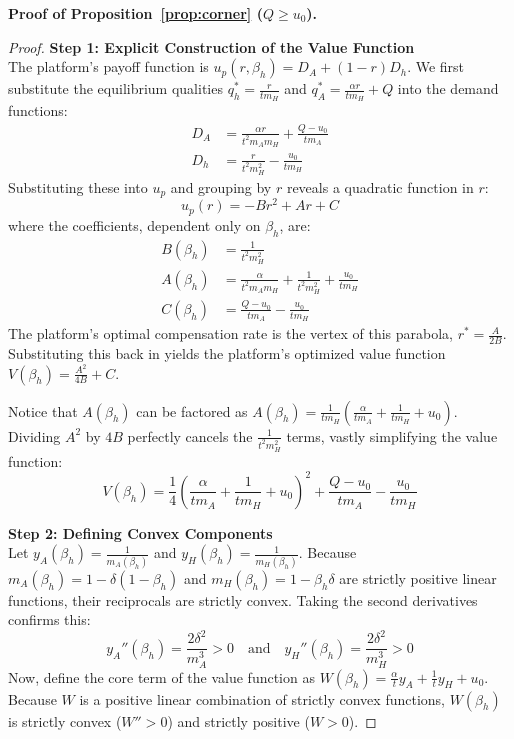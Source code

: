 \documentclass[mnsc,nonblindrev]{informs3_NoOR}
\begin{document}
\noindent\textbf{Proof of Proposition~\ref{prop:corner} ($Q \ge u_0$).}
\begin{proof}
\textbf{Step 1: Explicit Construction of the Value Function} \\
The platform's payoff function is $u_p(r, \beta_h) = D_A + (1-r)D_h$. We first substitute the equilibrium qualities $q_h^* = \frac{r}{tm_H}$ and $q_A^* = \frac{\alpha r}{tm_H} + Q$ into the demand functions:
\begin{align*}
D_A &= \frac{\alpha r}{t^2 m_A m_H} + \frac{Q-u_0}{t m_A} \\
D_h &= \frac{r}{t^2 m_H^2} - \frac{u_0}{t m_H}
\end{align*}
Substituting these into $u_p$ and grouping by $r$ reveals a quadratic function in $r$:
\begin{equation}
u_p(r) = -B r^2 + A r + C
\end{equation}
where the coefficients, dependent only on $\beta_h$, are:
\begin{align*}
B(\beta_h) &= \frac{1}{t^2 m_H^2} \\
A(\beta_h) &= \frac{\alpha}{t^2 m_A m_H} + \frac{1}{t^2 m_H^2} + \frac{u_0}{t m_H} \\
C(\beta_h) &= \frac{Q-u_0}{t m_A} - \frac{u_0}{t m_H}
\end{align*}
The platform's optimal compensation rate is the vertex of this parabola, $r^* = \frac{A}{2B}$. Substituting this back in yields the platform's optimized value function $V(\beta_h) = \frac{A^2}{4B} + C$. 

Notice that $A(\beta_h)$ can be factored as $A(\beta_h) = \frac{1}{t m_H} \left( \frac{\alpha}{t m_A} + \frac{1}{t m_H} + u_0 \right)$. Dividing $A^2$ by $4B$ perfectly cancels the $\frac{1}{t^2 m_H^2}$ terms, vastly simplifying the value function:
\begin{equation}
V(\beta_h) = \frac{1}{4} \left( \frac{\alpha}{t m_A} + \frac{1}{t m_H} + u_0 \right)^2 + \frac{Q-u_0}{t m_A} - \frac{u_0}{t m_H}
\end{equation}

\vspace{0.5em}
\noindent\textbf{Step 2: Defining Convex Components} \\
Let $y_A(\beta_h) = \frac{1}{m_A(\beta_h)}$ and $y_H(\beta_h) = \frac{1}{m_H(\beta_h)}$. 
Because $m_A(\beta_h) = 1 - \delta(1-\beta_h)$ and $m_H(\beta_h) = 1 - \beta_h\delta$ are strictly positive linear functions, their reciprocals are strictly convex. Taking the second derivatives confirms this:
\begin{equation*}
y_A''(\beta_h) = \frac{2\delta^2}{m_A^3} > 0 \quad \text{and} \quad y_H''(\beta_h) = \frac{2\delta^2}{m_H^3} > 0
\end{equation*}
Now, define the core term of the value function as $W(\beta_h) = \frac{\alpha}{t} y_A + \frac{1}{t} y_H + u_0$. Because $W$ is a positive linear combination of strictly convex functions, $W(\beta_h)$ is strictly convex ($W'' > 0$) and strictly positive ($W > 0$).


\end{proof}
\end{document}
